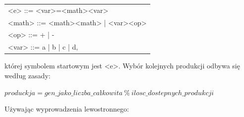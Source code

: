  \begin{center}
  \begin{tabular}{l}
    <e> ::= <var>=<math><var> \\
	<math> ::= <math><math> | <var><op> \\
	<op> ::= + | - \\
	<var> ::= a | b | c | d, \\
  \end{tabular}
 \end{center}

której symbolem startowym jest <e>. 
Wybór kolejnych produkcji odbywa się według zasady:
\begin{center} $produckja = gen\_jako\_liczba\_całkowita\ \%\ ilosc\_dostepnych\_produkcji$ \end{center}
Używając wyprowadzenia lewostronnego:

